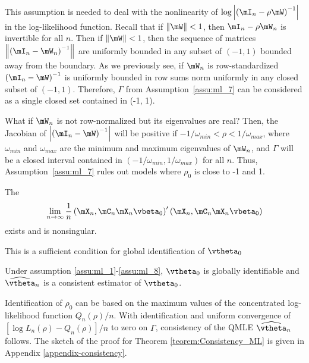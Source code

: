 This assumption is needed to deal with the nonlinearity of $\log \left|\left(\mI_n - \rho \mW\right)^{-1}\right|$ in the log-likelihood function. Recall that if $\left\| \mW\right\| < 1$, then $\mI_n - \rho\mW_n$ is invertible for all $n$. Then if $\left\| \mW\right\| < 1$, then the sequence of matrices $\left\|\left(\mI_n- \mW_n\right)^{-1}\right\|$ are uniformly bounded in any subset of $(-1, 1)$ bounded away from the boundary. As we previously see, if $\mW_n$ is row-standardized $\left(\mI_n- \mW\right)^{-1}$ is uniformly bounded in row sums norm uniformly in any closed subset of $(-1, 1)$. Therefore, $\Gamma$ from Assumption~\ref{assu:ml_7} can be considered as a single closed set contained in (-1, 1).

What if $\mW_n$ is not row-normalized but its eigenvalues are real? Then, the Jacobian of $\left|\left(\mI_n- \mW\right)^{-1}\right|$ will be positive if $-1/\omega_{min} < \rho < 1/\omega_{max}$, where $\omega_{min}$ and $\omega_{max}$ are the minimum and maximum eigenvalues of $\mW_n$, and $\Gamma$ will be a closed interval contained in $(-1/\omega_{min}, 1/\omega_{max})$ for all $n$. Thus, Assumption~\ref{assu:ml_7} rules out models where $\rho_0$ is close to -1 and 1.  

\begin{assumption}\label{assu:ml_8}
		The
		\begin{equation*}
			\lim_{n\to \infty}\frac{1}{n}\left(\mX_n, \mC_n\mX_n\vbeta_0\right)'\left(\mX_n, \mC_n\mX_n\vbeta_0\right)
		\end{equation*}
		 exists and is nonsingular.
\end{assumption}

This is a sufficient condition for global identification of $\vtheta_0$

\begin{theorem}[Consistency]\label{teorem:Consistency_ML}
	Under assumption \ref{assu:ml_1}-\ref{assu:ml_8}, $\vtheta_0$ is globally identifiable and $\widehat{\vtheta}_n$ is a consistent estimator of $\vtheta_0$.
\end{theorem}

Identification of $\rho_0$ can be based on the maximum values of the concentrated log-likelihood function $Q_n(\rho) / n$. With identification and uniform convergence of $\left[\log L_n(\rho) - Q_n(\rho)\right] / n$ to zero on $\Gamma$, consistency of the QMLE $\widehat{\vtheta}_n$ follows. The sketch of the proof for Theorem \ref{teorem:Consistency_ML} is given in Appendix \ref{appendix-consistency}. 


